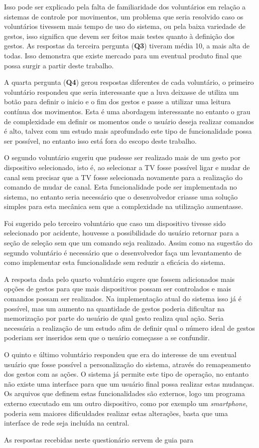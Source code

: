 Isso pode ser explicado pela falta de familiaridade dos voluntários em relação a sistemas de controle por movimentos, um problema que seria resolvido caso os voluntários tivessem mais tempo de uso do sistema, ou pela baixa variedade de gestos, isso significa que devem ser feitos mais testes quanto à definição dos gestos. As respostas da terceira pergunta (\textbf{Q3}) tiveram  média 10, a mais alta de todas. Isso demonstra que existe mercado para um eventual produto final que possa surgir a partir deste trabalho.  

A quarta pergunta (\textbf{Q4}) gerou respostas diferentes de cada voluntário, o primeiro voluntário respondeu que seria interessante que a luva deixasse de utiliza um botão para definir o inicio e o fim dos gestos e passe a utilizar uma leitura contínua dos movimentos. Esta é uma abordagem interessante no entanto o grau de complexidade em definir os momentos onde o usuário deseja realizar comandos é alto, talvez com um estudo mais aprofundado este tipo de funcionalidade possa ser possível, no entanto isso está fora do escopo deste trabalho. 

O segundo voluntário sugeriu que pudesse ser realizado mais de um gesto por dispositivo selecionado, isto é, ao selecionar a TV fosse possível ligar e mudar de canal sem precisar que a TV fosse selecionada novamente para a realização do comando de mudar de canal. Esta funcionalidade pode ser implementada no sistema, no entanto seria necessário que o desenvolvedor criasse uma solução simples para esta mecânica sem que a complexidade na utilização aumentasse.

Foi sugerido pelo terceiro voluntário que caso um dispositivo tivesse sido selecionado por acidente, houvesse a possibilidade do usuário retornar para a seção de seleção sem que um comando seja realizado. Assim como na sugestão do segundo voluntário é necessário que o desenvolvedor faça um levantamento de como implementar esta funcionalidade sem reduzir a eficácia do sistema.

A resposta dada pelo quarto voluntário sugere que fossem adicionados mais opções de gestos para que mais dispositivos possam ser controlados e mais comandos possam ser realizados. Na implementação atual do sistema isso já é possível, mas um aumento na quantidade de gestos poderia dificultar na memorização por parte do usuário de qual gesto realiza qual ação. Seria necessária a realização de um estudo afim de definir qual o número ideal de gestos poderiam ser inseridos sem que o usuário começasse a se confundir.

O quinto e último voluntário respondeu que era do interesse de um eventual usuário que fosse possível a personalização do sistema, através do remapeamento dos gestos com as ações. O sistema já permite este tipo de operação, no entanto não existe uma interface para que um usuário final possa realizar estas mudanças. Os arquivos que definem estas funcionalidades são externos, logo um programa externo executado em um outro dispositivo, como por exemplo um \textit{smartphone}, poderia sem maiores dificuldades realizar estas alterações, basta que uma interface de rede seja incluída na central.

As respostas recebidas neste questionário servem de guia para 